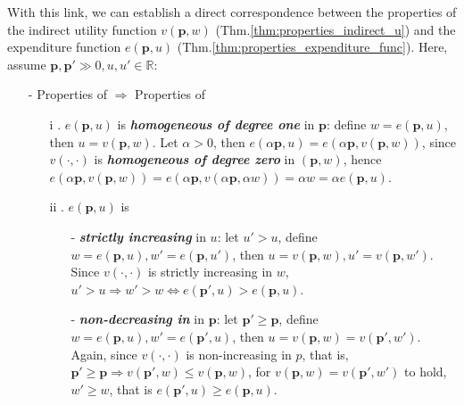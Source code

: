 With this link, we can establish a direct correspondence between the properties of the indirect utility function $v(\mathbf{p},w)$ (Thm.\ref{thm:properties_indirect_u}) and the expenditure function $e(\mathbf{p},u)$ (Thm.\ref{thm:properties_expenditure_func}). Here, assume $\mathbf{p},\mathbf{p}'\gg 0,u,u'\in\mathbb{R}$:
\begin{enumerate}
    \item[-] Properties of  $\Rightarrow$ Properties of  
    \begin{enumerate}
        \item[i] . $e(\mathbf{p},u)$ is \textit{\textbf{homogeneous of degree one}} in $\mathbf{p}$: define $w=e(\mathbf{p},u)$, then $u=v(\mathbf{p},w)$. Let $\alpha >0$, then $e(\alpha\mathbf{p},u)= e(\alpha\mathbf{p},v(\mathbf{p},w))$, since $v(\cdot,\cdot)$ is \textit{\textbf{homogeneous of degree zero}} in $(\mathbf{p},w)$,
        hence $e(\alpha\mathbf{p},v(\mathbf{p},w))=e(\alpha\mathbf{p},v(\alpha\mathbf{p},\alpha w))=\alpha w =\alpha e(\mathbf{p},u)$.
        \item[ii] . $e(\mathbf{p},u)$ is 
        \begin{enumerate}
            \item[-] \textit{\textbf{strictly increasing}} in $u$: let $u'>u$, define $w=e(\mathbf{p},u),w'=e(\mathbf{p},u')$, then $u=v(\mathbf{p},w),u'=v(\mathbf{p},w')$. Since $v(\cdot,\cdot)$ is strictly increasing in $w$, $u'>u\Rightarrow w'>w\Leftrightarrow e(\mathbf{p}',u)>e(\mathbf{p},u)$.
            \item[-] \textit{\textbf{non-decreasing in}} in $\mathbf{p}$: let $\mathbf{p}'\geq \mathbf{p}$, define $w=e(\mathbf{p},u),w'=e(\mathbf{p}',u)$, then $u=v(\mathbf{p},w)=v(\mathbf{p}',w')$. Again, since $v(\cdot,\cdot)$ is non-increasing in $p$, that is, $\mathbf{p}'\geq \mathbf{p}\Rightarrow v(\mathbf{p}',w)\leq v(\mathbf{p},w)$, for $v(\mathbf{p},w)=v(\mathbf{p}',w')$ to hold, $w'\geq w$, that is $e(\mathbf{p}',u)\geq e(\mathbf{p},u)$.
        \end{enumerate}
            

\end{enumerate}
\end{enumerate}
